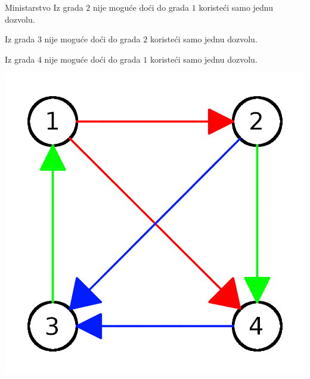 \begin{statement}[
  problempoints=100,
  timelimit=1 sekunda,
  memorylimit=1024 MiB,
]{Ministarstvo}
Iz grada $2$ nije moguće doći do grada $1$ koristeći samo jednu dozvolu.

Iz grada $3$ nije moguće doći do grada $2$ koristeći samo jednu dozvolu.

Iz grada $4$ nije moguće doći do grada $1$ koristeći samo jednu dozvolu.


\centering
\includegraphics[scale=1]{pic/skcia3.png}
  
\end{statement}

